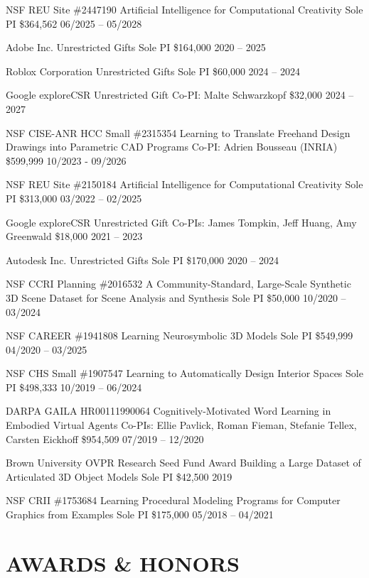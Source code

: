\documentclass[line,margin]{res}
\begin{document}
\begin{resume}
\funding
{NSF REU Site \#2447190}
{Artificial Intelligence for Computational Creativity}
{Sole PI}
{\$364,562}
{06/2025 -- 05/2028}

\funding
{Adobe Inc.}
{Unrestricted Gifts}
{Sole PI}
{\$164,000}
{2020 -- 2025}

\funding
{Roblox Corporation}
{Unrestricted Gifts}
{Sole PI}
{\$60,000}
{2024 -- 2024}

\funding
{Google exploreCSR}
{Unrestricted Gift}
{Co-PI: Malte Schwarzkopf}
{\$32,000}
{2024 -- 2027}

\funding
{NSF CISE-ANR HCC Small \#2315354}
{Learning to Translate Freehand Design Drawings into Parametric CAD Programs}
{Co-PI: Adrien Bousseau (INRIA)}
{\$599,999}
{10/2023 - 09/2026}

\funding
{NSF REU Site \#2150184}
{Artificial Intelligence for Computational Creativity}
{Sole PI}
{\$313,000}
{03/2022 -- 02/2025}

\funding
{Google exploreCSR}
{Unrestricted Gift}
{Co-PIs: James Tompkin, Jeff Huang, Amy Greenwald}
{\$18,000}
{2021 -- 2023}

\funding
{Autodesk Inc.}
{Unrestricted Gifts}
{Sole PI}
{\$170,000}
{2020 -- 2024}

\funding
{NSF CCRI Planning \#2016532}
{A Community-Standard, Large-Scale Synthetic 3D Scene Dataset for Scene Analysis and Synthesis}
{Sole PI}
{\$50,000}
{10/2020 -- 03/2024}

\funding
{NSF CAREER \#1941808}
{Learning Neurosymbolic 3D Models}
{Sole PI}
{\$549,999}
{04/2020 -- 03/2025}

\funding
{NSF CHS Small \#1907547}
{Learning to Automatically Design Interior Spaces}
{Sole PI}
{\$498,333}
{10/2019 -- 06/2024}

\funding
{DARPA GAILA HR00111990064}
{Cognitively-Motivated Word Learning in Embodied Virtual Agents}
{Co-PIs: Ellie Pavlick, Roman Fieman, Stefanie Tellex, Carsten Eickhoff}
{\$954,509}
{07/2019 -- 12/2020}

\funding
{Brown University OVPR Research Seed Fund Award}
{Building a Large Dataset of Articulated 3D Object Models}
{Sole PI}
{\$42,500}
{2019}

\funding
{NSF CRII \#1753684}
{Learning Procedural Modeling Programs for Computer Graphics from Examples}
{Sole PI}
{\$175,000}
{05/2018 -- 04/2021}


\section{AWARDS \& HONORS}


\end{resume}
\end{document}
